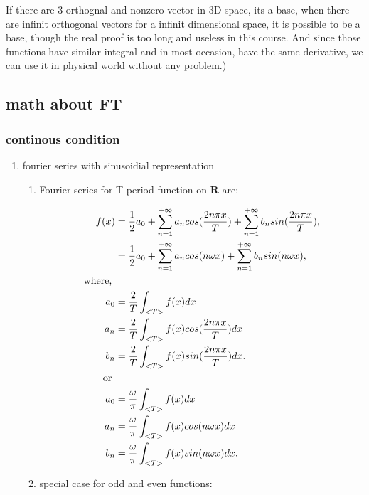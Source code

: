 \documentclass[11pt]{article}
\begin{document}
If there are 3 orthognal and nonzero vector in 3D space, its a base, when there are infinit orthogonal vectors for a infinit dimensional space, it is possible to be a base, though the real proof is too long and useless in this course. And since those functions have similar integral and in most occasion, have the same derivative, we can use it in physical world without any problem.)
\subsection{math about FT}
\label{sec:org576f32c}
\subsubsection{continous condition}
\label{sec:org520cda7}
\begin{enumerate}
\item fourier series with sinusoidial representation
\label{sec:org549983a}
\begin{enumerate}
\item Fourier series for T period function on \(\mathbf{R}\) are:
\label{sec:org887ecc1}

\begin{align}
  f(x) & =
         \frac{1}{2}a_0
         +
         \sum_{n = 1}^{+\infty}a_n  cos(\frac{2 n \pi x}{T})
         +
         \sum_{n = 1}^{+\infty}b_n  sin(\frac{2 n \pi x}{T}), \notag \\
       & =
         \frac{1}{2}a_0
         +
         \sum_{n = 1}^{+\infty}a_n  cos(n \omega x)
         +
         \sum_{n = 1}^{+\infty}b_n  sin(n \omega x), \notag \\
  \text{where, } & \notag \\
  a_0 & = \frac{2}{T} \int_{<T>}f(x)dx \notag \\
  a_n & = \frac{2}{T} \int_{<T>}f(x) cos(\frac{2 n \pi x}{T}) dx \notag \\
  b_n & = \frac{2}{T} \int_{<T>}f(x) sin(\frac{2 n \pi x}{T}) dx. \notag \\
  \text{or } & \notag \\
  a_0 & = \frac{\omega}{\pi} \int_{<T>}f(x)dx \notag \\
  a_n & = \frac{\omega}{\pi} \int_{<T>}f(x) cos(n \omega x) dx \notag \\
  b_n & = \frac{\omega}{\pi} \int_{<T>}f(x) sin(n \omega x) dx. \notag
\end{align}
\item special case for odd and even functions:
\label{sec:org1e2f928}


\end{enumerate}
\end{enumerate}
\end{document}
